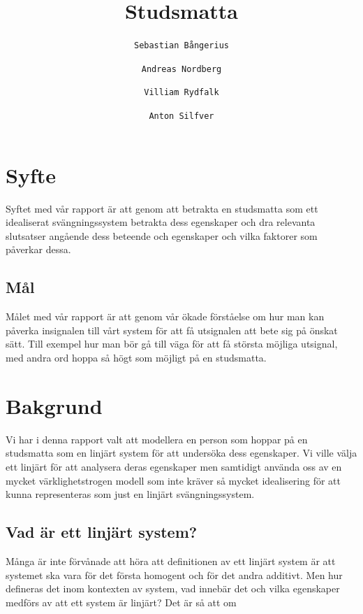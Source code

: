 \documentclass[10pt,a4paper]{article}
\author{
  \texttt{Sebastian Bångerius}
  \and
  \texttt{Andreas Nordberg}
  \and
  \texttt{Villiam Rydfalk}
  \and
  \texttt{Anton Silfver}
}
\begin{document}

\title{Studsmatta}
\maketitle

\cleardoublepage

\tableofcontents

\clearpage

\section{Syfte}
\setcounter{page}{3}

Syftet med vår rapport är att genom att betrakta en studsmatta som ett idealiserat svängningssystem betrakta dess egenskaper och dra relevanta slutsatser angående dess beteende och egenskaper och vilka faktorer som påverkar dessa.

\subsection{Mål}

Målet med vår rapport är att genom vår ökade förståelse om hur man kan påverka insignalen till vårt system för att få utsignalen att bete sig på önskat sätt. Till exempel hur man bör gå till väga för att få största möjliga utsignal, med andra ord hoppa så högt som möjligt på en studsmatta.

\section{Bakgrund}

Vi har i denna rapport valt att modellera en person som hoppar på en studsmatta som en linjärt system för att undersöka dess egenskaper. Vi ville välja ett linjärt för att analysera deras egenskaper men samtidigt använda oss av en mycket värklighetstrogen modell som inte kräver så mycket idealisering för att kunna representeras som just en linjärt svängningssystem.

\subsection{Vad är ett linjärt system?}

Många är inte förvånade att höra att definitionen av ett linjärt system är att systemet ska vara för det första homogent och för det andra additivt. Men hur defineras det inom kontexten av system, vad innebär det och vilka egenskaper medförs av att ett system är linjärt? Det är så att om
\end{document}
